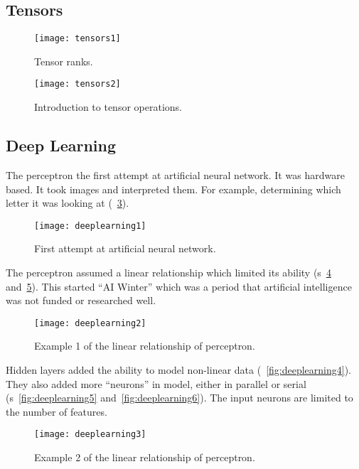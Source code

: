 	\subsection{Tensors}

 	\begin{figure}[tbh]
		\centering
		\texttt{[image: tensors1]}
		\caption[Tensor ranks]{Tensor ranks.}
		\label{fig:tensors1}
	\end{figure}
 	\begin{figure}[tbh]
		\centering
		\texttt{[image: tensors2]}
		\caption[Introduction to tensor operations]{Introduction to tensor operations.}
		\label{fig:tensors2}
	\end{figure}

	\subsection{Deep Learning}

The perceptron the first attempt at artificial neural network.  It was hardware based.  It took images and interpreted them.  For example, determining which letter it was looking at (\figurename~\ref{fig:deeplearning1}).
 	\begin{figure}[h]
		\centering
		\texttt{[image: deeplearning1]}
		\caption[First attempt at artificial neural network]{First attempt at artificial neural network.}
		\label{fig:deeplearning1}
	\end{figure}

The perceptron assumed a linear relationship which limited its ability (\figurename{}s~\ref{fig:deeplearning2} and~\ref{fig:deeplearning3}).  This started ``AI Winter'' which was a period that artificial intelligence was not funded or researched well.

 	\begin{figure}[tbh]
		\centering
		\texttt{[image: deeplearning2]}
		\caption[Example 1 of the linear relationship of perceptron]{Example 1 of the linear relationship of perceptron.}
		\label{fig:deeplearning2}
	\end{figure}

Hidden layers added the ability to model non-linear data (\figurename~\ref{fig:deeplearning4}).  They also added more ``neurons'' in model, either in parallel or serial (\figurename{}s~\ref{fig:deeplearning5} and~\ref{fig:deeplearning6}).  The input neurons are limited to the number of features.

 	\begin{figure}[h]
		\centering
		\texttt{[image: deeplearning3]}
		\caption[Example 2 of the linear relationship of perceptron]{Example 2 of the linear relationship of perceptron.}
		\label{fig:deeplearning3}
	\end{figure}

